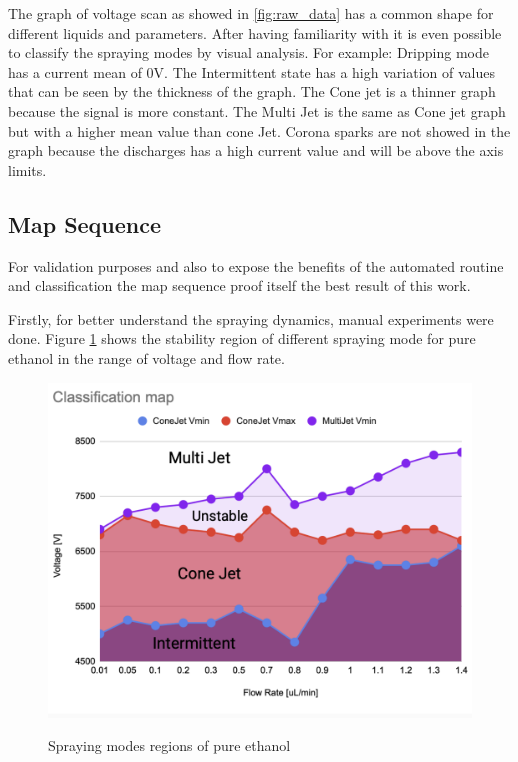 The graph of voltage scan as showed in \ref{fig:raw_data} has a common shape for different liquids and parameters. After having familiarity with it is even possible to classify the spraying modes by visual analysis. For example: 
Dripping mode has a current mean of 0V. The Intermittent state has a high variation of values that can be seen by the thickness of the graph. The Cone jet is a thinner graph because the signal is more constant. The Multi Jet is the same as Cone jet graph but with a higher mean value than cone Jet. Corona sparks are not showed in the graph because the discharges has a high current value and will be above the axis limits.



\subsection{Map Sequence}
\label{subsec:map_results}

For validation purposes and also to expose the benefits of the automated routine and classification the map sequence proof itself the best result of this work.




    Firstly, for better understand the spraying dynamics, manual experiments were done.
    Figure \ref{fig:stability_1} shows the stability region of different spraying mode for pure ethanol in the range of voltage and flow rate.

    \begin{figure}[H]
        \center
        \includegraphics[width=12cm]{Figuras/regions.png}
        \label{fig:stability_1}
        \caption{Spraying modes regions of pure ethanol}
    \end{figure}


